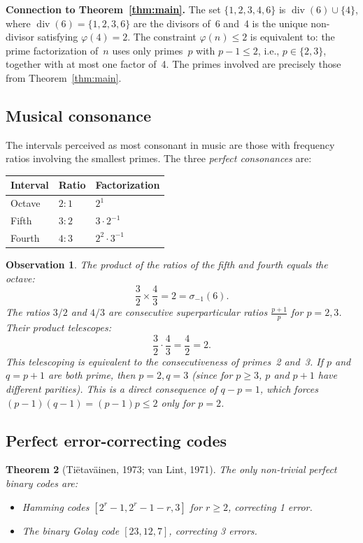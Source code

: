 \documentclass{amsart}
\newtheorem{theorem}{Theorem}[section]
\newtheorem{observation}[theorem]{Observation}
\begin{document}
\textbf{Connection to Theorem~\ref{thm:main}.} The set $\{1, 2, 3, 4, 6\}$ is $\operatorname{div}(6) \cup \{4\}$, where $\operatorname{div}(6) = \{1, 2, 3, 6\}$ are the divisors of~6 and~4 is the unique non-divisor satisfying $\varphi(4) = 2$. The constraint $\varphi(n) \leq 2$ is equivalent to: the prime factorization of~$n$ uses only primes~$p$ with $p - 1 \leq 2$, i.e., $p \in \{2, 3\}$, together with at most one factor of~4. The primes involved are precisely those from Theorem~\ref{thm:main}.

\subsection{Musical consonance}

The intervals perceived as most consonant in music are those with frequency ratios involving the smallest primes. The three \emph{perfect consonances} are:

\begin{center}
\begin{tabular}{lll}
\toprule
Interval & Ratio & Factorization \\
\midrule
Octave & $2:1$ & $2^1$ \\
Fifth & $3:2$ & $3 \cdot 2^{-1}$ \\
Fourth & $4:3$ & $2^2 \cdot 3^{-1}$ \\
\bottomrule
\end{tabular}
\end{center}

\begin{observation}\label{obs:octave}
The product of the ratios of the fifth and fourth equals the octave:
\[
\frac{3}{2} \times \frac{4}{3} = 2 = \sigma_{-1}(6).
\]
The ratios $3/2$ and $4/3$ are consecutive superparticular ratios $\frac{p+1}{p}$ for $p = 2, 3$. Their product telescopes:
\[
\frac{3}{2} \cdot \frac{4}{3} = \frac{4}{2} = 2.
\]
This telescoping is equivalent to the consecutiveness of primes~2 and~3. If $p$ and $q = p + 1$ are both prime, then $p = 2, q = 3$ (since for $p \geq 3$, $p$ and $p+1$ have different parities). This is a direct consequence of $q - p = 1$, which forces $(p-1)(q-1) = (p-1)p \leq 2$ only for $p = 2$.
\end{observation}

\subsection{Perfect error-correcting codes}

\begin{theorem}[Ti\"etav\"ainen, 1973; van Lint, 1971]\label{thm:perfect-codes}
The only non-trivial perfect binary codes are:
\begin{itemize}
\item Hamming codes $[2^r - 1, 2^r - 1 - r, 3]$ for $r \geq 2$, correcting 1 error.
\item The binary Golay code $[23, 12, 7]$, correcting 3 errors.
\end{itemize}
\end{theorem}
\end{document}
